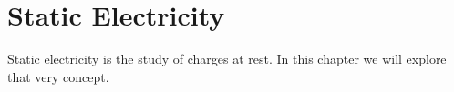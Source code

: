 \documentclass[../main.tex]{subfiles}
\begin{document}
	\section{Static Electricity}
		\begin{preamb}
			Static electricity is the study of charges at rest. In this chapter we will explore that very concept.
		\end{preamb}
\end{document}
